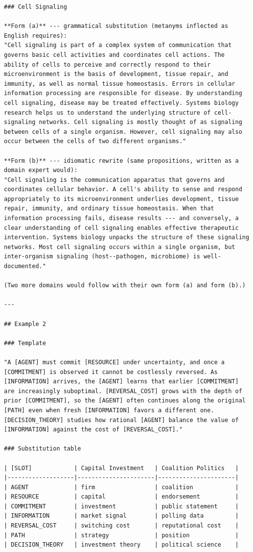 \documentclass{article}
\begin{document}
\begin{lstlisting}
### Cell Signaling

**Form (a)** --- grammatical substitution (metanyms inflected as English requires):
"Cell signaling is part of a complex system of communication that governs basic cell activities and coordinates cell actions. The ability of cells to perceive and correctly respond to their microenvironment is the basis of development, tissue repair, and immunity, as well as normal tissue homeostasis. Errors in cellular information processing are responsible for disease. By understanding cell signaling, disease may be treated effectively. Systems biology research helps us to understand the underlying structure of cell-signaling networks. Cell signaling is mostly thought of as signaling between cells of a single organism. However, cell signaling may also occur between the cells of two different organisms."

**Form (b)** --- idiomatic rewrite (same propositions, written as a domain expert would):
"Cell signaling is the communication apparatus that governs and coordinates cellular behavior. A cell's ability to sense and respond appropriately to its microenvironment underlies development, tissue repair, immunity, and ordinary tissue homeostasis. When that information processing fails, disease results --- and conversely, a clear understanding of cell signaling enables effective therapeutic intervention. Systems biology unpacks the structure of these signaling networks. Most cell signaling occurs within a single organism, but inter-organism signaling (host--pathogen, microbiome) is well-documented."

(Two more domains would follow with their own form (a) and form (b).)

---

## Example 2

### Template

"A [AGENT] must commit [RESOURCE] under uncertainty, and once a [COMMITMENT] is observed it cannot be costlessly reversed. As [INFORMATION] arrives, the [AGENT] learns that earlier [COMMITMENT] are increasingly suboptimal. [REVERSAL_COST] grows with the depth of prior [COMMITMENT], so the [AGENT] often continues along the original [PATH] even when fresh [INFORMATION] favors a different one. [DECISION_THEORY] studies how rational [AGENT] balance the value of [INFORMATION] against the cost of [REVERSAL_COST]."

### Substitution table

| [SLOT]            | Capital Investment   | Coalition Politics   |
|-------------------|----------------------|----------------------|
| AGENT             | firm                 | coalition            |
| RESOURCE          | capital              | endorsement          |
| COMMITMENT        | investment           | public statement     |
| INFORMATION       | market signal        | polling data         |
| REVERSAL_COST     | switching cost       | reputational cost    |
| PATH              | strategy             | position             |
| DECISION_THEORY   | investment theory    | political science    |


\end{lstlisting}
\end{document}
